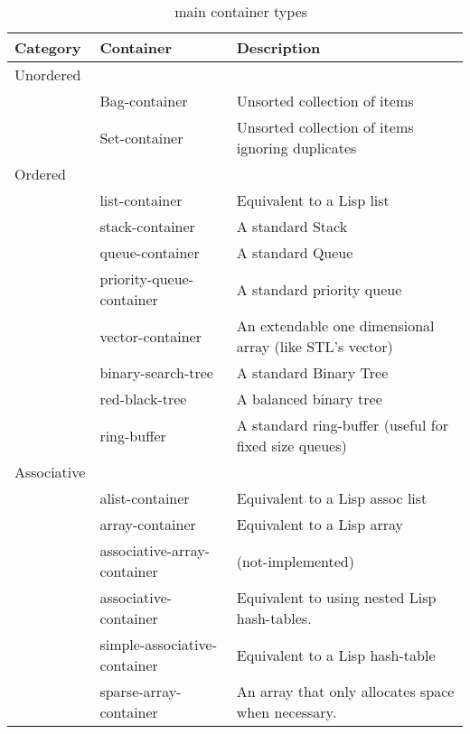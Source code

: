 \documentclass{acm_proc_article-sp}
\begin{document}
\begin{table*}[htb!]
\centering
\begin{tabular}{|lp{1.75 in}p{2.75 in}|} \hline
Category & \vline \quad Container & \vline \quad Description \\ \hline
\hline

Unordered & & \\
 & Bag-container & Unsorted collection of items \\
 & Set-container & Unsorted collection of items ignoring duplicates \\ 

\hline
Ordered & & \\
 & list-container & Equivalent to a Lisp list \\
 & stack-container & A standard Stack \\
 & queue-container & A standard Queue \\
 & priority-queue-container & A standard priority queue \\
 & vector-container & An extendable one dimensional array (like STL's
vector)
\\
 & binary-search-tree & A standard Binary Tree \\
 & red-black-tree & A balanced binary tree \\
 & ring-buffer & A standard ring-buffer (useful for fixed size queues) \\

\hline
Associative & & \\
 & alist-container & Equivalent to a Lisp assoc list \\
 & array-container & Equivalent to a Lisp array \\
 & associative-array-container & (not-implemented) \\
 & associative-container & Equivalent to using nested
Lisp hash-tables. \\
 & simple-associative-container & Equivalent to a Lisp hash-table \\
 & sparse-array-container & An array that only allocates space when
necessary. \\
\hline

\end{tabular}
\label{tbl:container-types}
\caption{\clcl~ main container types}
\end{table*}
\end{document}
